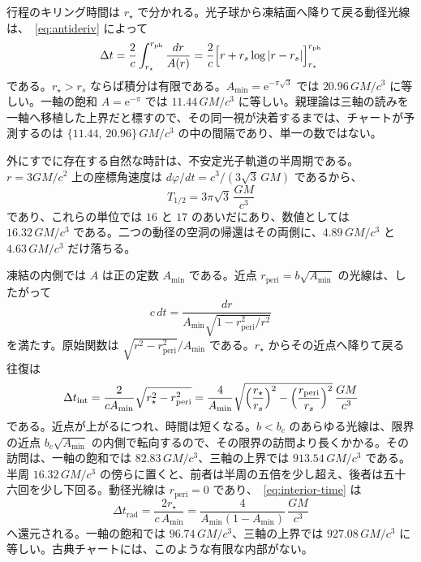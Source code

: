 \documentclass[a4paper]{article}
\begin{document}
行程のキリング時間は \(r_\star\) で分かれる。光子球から凍結面へ降りて戻る動径光線は、~\eqref{eq:antideriv} によって
\begin{equation}
\label{eq:echo-delay}
\Delta t
  =\frac{2}{c}\int_{r_\star}^{r_{\mathrm{ph}}}\frac{dr}{A(r)}
  =\frac{2}{c}\Bigl[r+r_s\log|r-r_s|\Bigr]_{r_\star}^{r_{\mathrm{ph}}}
\end{equation}
である。\(r_\star>r_s\) ならば積分は有限である。\(A_{\min}=\mathrm{e}^{-\pi\sqrt{3}}\) では \(20.96\,GM/c^3\) に等しい。一軸の飽和 \(A=\mathrm{e}^{-\pi}\) では \(11.44\,GM/c^3\) に等しい。親理論は三軸の読みを一軸へ移植した上界だと標すので、その同一視が決着するまでは、チャートが予測するのは \(\{11.44,\,20.96\}\,GM/c^3\) の中の間隔であり、単一の数ではない。

外にすでに存在する自然な時計は、不安定光子軌道の半周期である。\(r=3GM/c^2\) 上の座標角速度は \(d\varphi/dt=c^3/(3\sqrt{3}\,GM)\) であるから、
\begin{equation}
\label{eq:half-orbit}
T_{1/2}=3\pi\sqrt{3}\,\frac{GM}{c^3}
\end{equation}
であり、これらの単位では \(16\) と \(17\) のあいだにあり、数値としては \(16.32\,GM/c^3\) である。二つの動径の空洞の帰還はその両側に、\(4.89\,GM/c^3\) と \(4.63\,GM/c^3\) だけ落ちる。

凍結の内側では \(A\) は正の定数 \(A_{\min}\) である。近点 \(r_{\mathrm{peri}}=b\sqrt{A_{\min}}\) の光線は、したがって
\[
c\,dt=\frac{dr}{A_{\min}\sqrt{1-r_{\mathrm{peri}}^2/r^2}}
\]
を満たす。原始関数は \(\sqrt{r^2-r_{\mathrm{peri}}^2}/A_{\min}\) である。\(r_\star\) からその近点へ降りて戻る往復は
\begin{equation}
\label{eq:interior-time}
\Delta t_{\mathrm{int}}
  =\frac{2}{c A_{\min}}\sqrt{r_\star^2-r_{\mathrm{peri}}^2}
  =\frac{4}{A_{\min}}
    \sqrt{\Bigl(\frac{r_\star}{r_s}\Bigr)^2
      -\Bigl(\frac{r_{\mathrm{peri}}}{r_s}\Bigr)^2}
    \,\frac{GM}{c^3}
\end{equation}
である。近点が上がるにつれ、時間は短くなる。\(b<b_c\) のあらゆる光線は、限界の近点 \(b_c\sqrt{A_{\min}}\) の内側で転向するので、その限界の訪問より長くかかる。その訪問は、一軸の飽和では \(82.83\,GM/c^3\)、三軸の上界では \(913.54\,GM/c^3\) である。半周 \(16.32\,GM/c^3\) の傍らに置くと、前者は半周の五倍を少し超え、後者は五十六回を少し下回る。動径光線は \(r_{\mathrm{peri}}=0\) であり、~\eqref{eq:interior-time} は
\begin{equation}
\label{eq:interior-radial}
\Delta t_{\mathrm{rad}}=\frac{2r_\star}{c\,A_{\min}}
  =\frac{4}{A_{\min}(1-A_{\min})}\,\frac{GM}{c^3}
\end{equation}
へ還元される。一軸の飽和では \(96.74\,GM/c^3\)、三軸の上界では \(927.08\,GM/c^3\) に等しい。古典チャートには、このような有限な内部がない。
\end{document}
